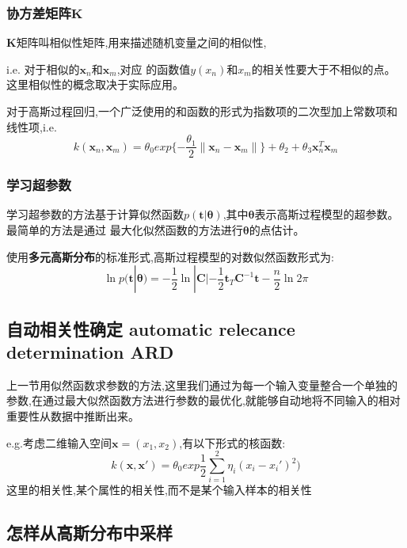 \documentclass[UTF8,a4paper]{ctexart}
\begin{document}
            \subsubsection{协方差矩阵$\bm K$}
            $\bm K$矩阵叫相似性矩阵,用来描述随机变量之间的相似性,

            i.e. 对于相似的$\bm x_n$和$\bm x_m$,对应 的函数值$y(x_n)$和$x_m$的相关性要大于不相似的点。这里相似性的概念取决于实际应用。

            对于高斯过程回归,一个广泛使用的和函数的形式为指数项的二次型加上常数项和线性项,i.e.
            \begin{equation}
                k(\bm x_n,\bm x_m) = \theta_0 exp\{-\frac{\theta_1}{2}\| \bm x_n - \bm x_m \|\} + \theta_2 + \theta_3\bm x_n^T \bm x_m
            \end{equation}

            \subsubsection{学习超参数}
            学习超参数的方法基于计算似然函数$p(\bm t|\bm \theta)$,其中$\bm \theta$表示高斯过程模型的超参数。最简单的方法是通过
            最大化似然函数的方法进行$\bm \theta$的点估计。

            使用\textbf{多元高斯分布}的标准形式,高斯过程模型的对数似然函数形式为:
            \begin{equation}
                \ln p(\bm t|\bm \theta) = -\frac{1}{2}\ln|\bm C| - \frac{1}{2}\bm t_T\bm C^{-1}\bm t - \frac{n}{2}\ln 2\pi
            \end{equation}

        \subsection{自动相关性确定 automatic relecance determination ARD}
        上一节用似然函数求参数的方法,这里我们通过为每一个输入变量整合一个单独的参数,在通过最大似然函数方法进行参数的最优化,就能够自动地将不同输入的相对重要性从数据中推断出来。

        e.g.考虑二维输入空间$\bm x = (x_1,x_2)$,有以下形式的核函数:
        \begin{equation}
            k(\bm x , \bm x') = \theta_0 exp{\frac{1}{2}\sum_{i = 1}^2\eta_i(x_i - x_i')^2})
        \end{equation}
        {\color{blue}这里的相关性,某个属性的相关性,而不是某个输入样本的相关性}

        \subsection{怎样从高斯分布中采样}
\end{document}
